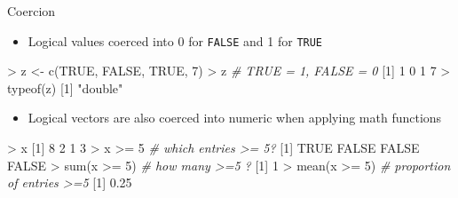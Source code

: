 \documentclass[
  ignorenonframetext,
]{beamer}
\newenvironment{Shaded}{\begin{snugshade}}{\end{snugshade}}
\newcommand{\CommentTok}[1]{\textcolor[rgb]{0.56,0.35,0.01}{\textit{#1}}}
\newcommand{\ConstantTok}[1]{\textcolor[rgb]{0.00,0.00,0.00}{#1}}
\newcommand{\DecValTok}[1]{\textcolor[rgb]{0.00,0.00,0.81}{#1}}
\newcommand{\FloatTok}[1]{\textcolor[rgb]{0.00,0.00,0.81}{#1}}
\newcommand{\FunctionTok}[1]{\textcolor[rgb]{0.00,0.00,0.00}{#1}}
\newcommand{\NormalTok}[1]{#1}
\newcommand{\OtherTok}[1]{\textcolor[rgb]{0.56,0.35,0.01}{#1}}
\newcommand{\SpecialCharTok}[1]{\textcolor[rgb]{0.00,0.00,0.00}{#1}}
\newcommand{\StringTok}[1]{\textcolor[rgb]{0.31,0.60,0.02}{#1}}
\providecommand{\tightlist}{%
  \setlength{\itemsep}{0pt}\setlength{\parskip}{0pt}}
\begin{document}
\begin{frame}[fragile]{Coercion}
\protect\hypertarget{coercion-1}{}
\begin{itemize}[<+->]
\tightlist
\item
  Logical values coerced into 0 for \texttt{FALSE} and 1 for
  \texttt{TRUE}
\end{itemize}

\begin{Shaded}
\begin{Highlighting}[]
\SpecialCharTok{\textgreater{}}\NormalTok{ z }\OtherTok{\textless{}{-}} \FunctionTok{c}\NormalTok{(}\ConstantTok{TRUE}\NormalTok{, }\ConstantTok{FALSE}\NormalTok{, }\ConstantTok{TRUE}\NormalTok{, }\DecValTok{7}\NormalTok{)}
\SpecialCharTok{\textgreater{}}\NormalTok{ z   }\CommentTok{\# TRUE = 1, FALSE = 0}
\NormalTok{[}\DecValTok{1}\NormalTok{] }\DecValTok{1} \DecValTok{0} \DecValTok{1} \DecValTok{7}
\SpecialCharTok{\textgreater{}} \FunctionTok{typeof}\NormalTok{(z)}
\NormalTok{[}\DecValTok{1}\NormalTok{] }\StringTok{"double"}
\end{Highlighting}
\end{Shaded}

\begin{itemize}[<+->]
\tightlist
\item
  Logical vectors are also coerced into numeric when applying math
  functions
\end{itemize}

\begin{Shaded}
\begin{Highlighting}[]
\SpecialCharTok{\textgreater{}}\NormalTok{ x}
\NormalTok{[}\DecValTok{1}\NormalTok{] }\DecValTok{8} \DecValTok{2} \DecValTok{1} \DecValTok{3}
\SpecialCharTok{\textgreater{}}\NormalTok{ x }\SpecialCharTok{\textgreater{}=} \DecValTok{5}  \CommentTok{\# which entries \textgreater{}= 5?}
\NormalTok{[}\DecValTok{1}\NormalTok{]  }\ConstantTok{TRUE} \ConstantTok{FALSE} \ConstantTok{FALSE} \ConstantTok{FALSE}
\SpecialCharTok{\textgreater{}} \FunctionTok{sum}\NormalTok{(x }\SpecialCharTok{\textgreater{}=} \DecValTok{5}\NormalTok{)  }\CommentTok{\# how many \textgreater{}=5 ?}
\NormalTok{[}\DecValTok{1}\NormalTok{] }\DecValTok{1}
\SpecialCharTok{\textgreater{}} \FunctionTok{mean}\NormalTok{(x }\SpecialCharTok{\textgreater{}=} \DecValTok{5}\NormalTok{) }\CommentTok{\# proportion of entries \textgreater{}=5}
\NormalTok{[}\DecValTok{1}\NormalTok{] }\FloatTok{0.25}
\end{Highlighting}
\end{Shaded}
\end{frame}
\end{document}
